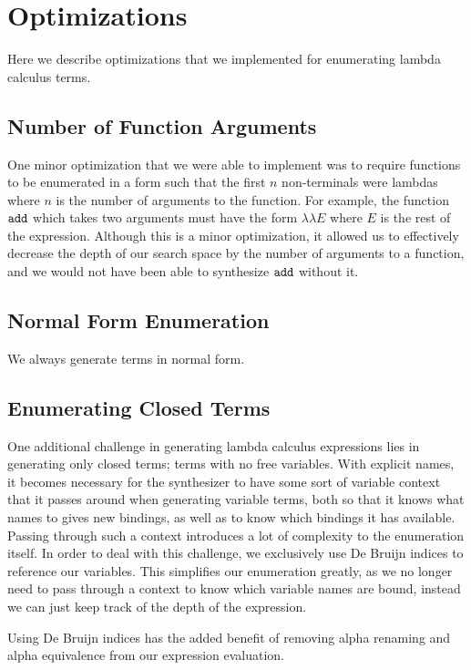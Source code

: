 \section{Optimizations} \label{sec:optimizations}
Here we describe optimizations that we implemented for enumerating lambda
  calculus terms.

\subsection{Number of Function Arguments}
One minor optimization that we were able to implement was to require
  functions to be enumerated in a form such that the first $n$ non-terminals
  were lambdas where $n$ is the number of arguments to the function.
For example, the function $\texttt{add}$ which takes two arguments must have the
  form $\lambda \lambda E$ where $E$ is the rest of the expression.
Although this is a minor optimization, it allowed us to effectively decrease
  the depth of our search space by the number of arguments to a function, and
  we would not have been able to synthesize $\texttt{add}$ without it.

\subsection{Normal Form Enumeration}
We always generate terms in normal form.

\subsection{Enumerating Closed Terms}
One additional challenge in generating lambda calculus expressions lies in
  generating only closed terms; terms with no free variables.
With explicit names, it becomes necessary for the synthesizer to have some
  sort of variable context that it passes around when generating variable
  terms, both so that it knows what names to gives new bindings, as well as
  to know which bindings it has available.
Passing through such a context introduces a lot of complexity to the
  enumeration itself.
In order to deal with this challenge, we exclusively use De Bruijn indices
  to reference our variables.
This simplifies our enumeration greatly, as we no longer need to pass through
  a context to know which variable names are bound, instead we can just keep
  track of the depth of the expression.

Using De Bruijn indices has the added benefit of removing alpha renaming and
  alpha equivalence from our expression evaluation.
